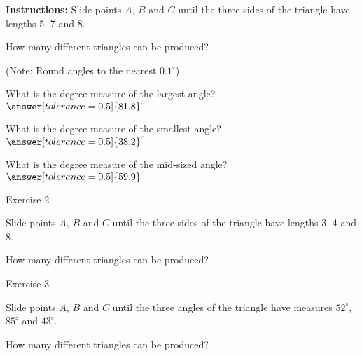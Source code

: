 \documentclass{ximera}
\begin{document}
{\bf {Instructions:}} Slide points $A$, $B$ and $C$ until the three sides of the triangle have lengths 5, 7 and 8. 

\begin{question}
How many different triangles can be produced?
\begin{multipleChoice}
\end{multipleChoice}

\begin{question}
(Note: Round angles to the nearest $0.1^\circ$)

What is the degree measure of the largest angle? $\answer[tolerance=0.5]{81.8}^\circ$

What is the degree measure of the smallest angle? $\answer[tolerance=0.5]{38.2}^\circ$

What is the degree measure of the mid-sized angle? $\answer[tolerance=0.5]{59.9}^\circ$
\end{question}
\end{question}

\bigskip

Exercise 2

Slide points $A$, $B$ and $C$ until the three sides of the triangle have lengths 3, 4 and 8. 

\begin{question}
How many different triangles can be produced?
\begin{multipleChoice}
\end{multipleChoice}

\end{question}

\bigskip

Exercise 3

Slide points $A$, $B$ and $C$ until the three angles of the triangle have measures $52^\circ$, $85^\circ$ and $43^\circ$. 

\begin{question}
How many different triangles can be produced?
\begin{multipleChoice}
\end{multipleChoice}

\end{question}
\end{document}

